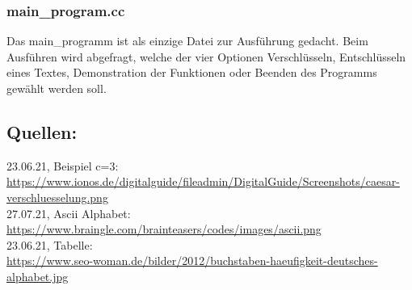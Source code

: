 \documentclass[ngerman,12pt]{article}
\begin{document}
\subsubsection*{main\_program.cc}

Das main\_programm ist als einzige Datei zur Ausführung gedacht. Beim Ausführen wird abgefragt, welche der vier Optionen Verschlüsseln, Entschlüsseln eines Textes, Demonstration der Funktionen oder Beenden des Programms gewählt werden soll. 

\newpage
\subsection*{Quellen:}

23.06.21, Beispiel c=3: \\
\url{https://www.ionos.de/digitalguide/fileadmin/DigitalGuide/Screenshots/caesar-verschluesselung.png}\\
27.07.21, Ascii Alphabet: \\
\url{https://www.braingle.com/brainteasers/codes/images/ascii.png}\\
23.06.21, Tabelle: \\
\url{https://www.seo-woman.de/bilder/2012/buchstaben-haeufigkeit-deutsches-alphabet.jpg}\\
 
\end{document}
